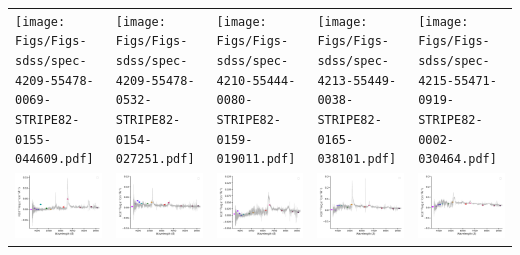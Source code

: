 \begin{center}
\begin{longtable}{l l l l l }
    \texttt{[image: Figs/Figs-sdss/spec-4209-55478-0069-STRIPE82-0155-044609.pdf]} & \texttt{[image: Figs/Figs-sdss/spec-4209-55478-0532-STRIPE82-0154-027251.pdf]} & \texttt{[image: Figs/Figs-sdss/spec-4210-55444-0080-STRIPE82-0159-019011.pdf]} & \texttt{[image: Figs/Figs-sdss/spec-4213-55449-0038-STRIPE82-0165-038101.pdf]} & \texttt{[image: Figs/Figs-sdss/spec-4215-55471-0919-STRIPE82-0002-030464.pdf]} \\
    \includegraphics[width=0.19\linewidth, clip]{Figs/Figs-sdss/spec-4217-55478-0338-STRIPE82-0003-028018.pdf} & \includegraphics[width=0.19\linewidth, clip]{Figs/Figs-sdss/spec-4217-55478-0796-STRIPE82-0004-029068.pdf} & \includegraphics[width=0.19\linewidth, clip]{Figs/Figs-sdss/spec-4219-55480-0333-STRIPE82-0009-033328.pdf} & \includegraphics[width=0.19\linewidth, clip]{Figs/Figs-sdss/spec-4374-55883-0621-SPLUS-s02s02-030289.pdf} & \includegraphics[width=0.19\linewidth, clip]{Figs/Figs-sdss/spec-4377-55828-0912-SPLUS-s02s07-022389.pdf} \\

\end{longtable}
\end{center}

